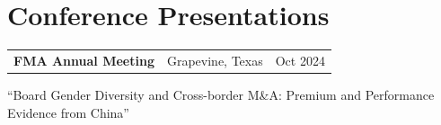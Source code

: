 \section{Conference Presentations}

\begin{tabularx}{\linewidth}{@{}l X r@{}}
\textbf{FMA Annual Meeting} & Grapevine, Texas & Oct 2024 \\
\end{tabularx}
``Board Gender Diversity and Cross-border M\&A: Premium and Performance Evidence from China''
